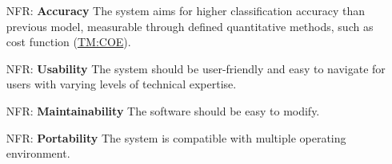 \documentclass[12pt]{article}
\newcounter{nfrnum} %
\begin{document}
\noindent \begin{itemize}

\item[NFR\refstepcounter{nfrnum}\thenfrnum \label{NFR_Accuracy}:]
  \textbf{Accuracy} 
  The system aims for higher classification accuracy than previous model, 
  measurable through defined quantitative methods, such as cost function (\hyperref[TM:COE]{TM:COE}). 

\item[NFR\refstepcounter{nfrnum}\thenfrnum \label{NFR_Usability}:] \textbf{Usability} 
The system should be user-friendly and easy to navigate for users with varying levels of technical expertise.

\item[NFR\refstepcounter{nfrnum}\thenfrnum \label{NFR_Maintainability}:]
  \textbf{Maintainability} 
  The software should be easy to modify.

\item[NFR\refstepcounter{nfrnum}\thenfrnum \label{NFR_Portability}:]
  \textbf{Portability} The system is compatible with multiple operating environment.


\end{itemize}
\end{document}
